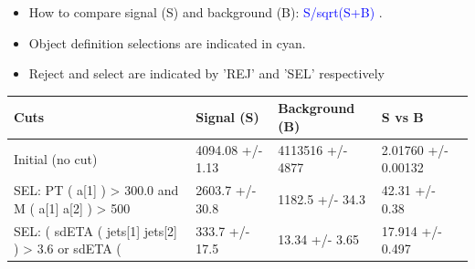 \documentclass[a4paper, 10pt]{article}
\begin{document}
\begin{itemize}
  \item How to compare signal (S) and background (B): \textcolor{blue}{S/\-sqrt(S+B)} .
   \item Object definition selections are indicated in cyan.  \item Reject and select are indicated by 'REJ' and 'SEL' respectively
\end{itemize}
\begin{table}[H]
  \begin{center}
    \begin{tabular}{|m{36.0mm}|m{36.0mm}|m{36.0mm}|m{33.0mm}|}
      \hline
      {\cellcolor{yellow}        Cuts}& {\cellcolor{yellow}         Signal (S)}& {\cellcolor{yellow}         Background (B)}& {\cellcolor{yellow}         S vs B}\\
      \hline
      {\cellcolor{white}         Initial (no cut)}& {\cellcolor{white}         4094.08 +/\-- 1.13}& {\cellcolor{white}         4113516 +/\-- 4877}& {\cellcolor{white}         2.01760 +/\-- 0.00132}\\
      \hline
      {\cellcolor{white} SEL: PT ( a[1] ) > 300.0 and M ( a[1] a[2] ) > 500}& {\cellcolor{white}         2603.7 +/\-- 30.8}& {\cellcolor{white}         1182.5 +/\-- 34.3}& {\cellcolor{white}         42.31 +/\-- 0.38}\\
      \hline
      {\cellcolor{white} SEL: ( sdETA ( jets[1] jets[2] ) > 3.6 or sdETA ( }& {\cellcolor{white}         333.7 +/\-- 17.5}& {\cellcolor{white}         13.34 +/\-- 3.65}& {\cellcolor{white}         17.914 +/\-- 0.497}\\
\hline
    \end{tabular}
  \end{center}
\end{table}
\end{document}
